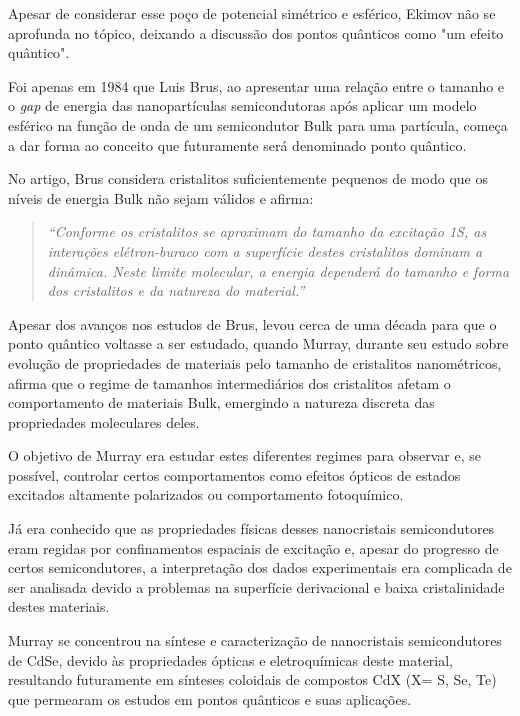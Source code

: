 \documentclass[11pt]{article}
\numberwithin{equation}{section}
\begin{document}
\par Apesar de considerar esse poço de potencial simétrico e esférico, Ekimov não se aprofunda no tópico, deixando a discussão dos pontos quânticos como "um efeito quântico".

\par Foi apenas em 1984 que Luis Brus, ao apresentar uma relação entre o tamanho e o \textit{gap} de energia das nanopartículas semicondutoras após aplicar um modelo esférico na função de onda de um semicondutor Bulk para uma partícula, começa a dar forma ao conceito que futuramente será denominado ponto quântico.

\par No artigo\cite{introducao3}, Brus considera cristalitos suficientemente pequenos de modo que os níveis de energia Bulk não sejam válidos e afirma:

\begin{quote}
\textit{“Conforme os cristalitos se aproximam do tamanho da excitação 1S, as interações elétron-buraco com a superfície destes cristalitos dominam a dinâmica. Neste limite molecular, a energia dependerá do tamanho e forma dos cristalitos e da natureza do material.”}
\end{quote}

\par Apesar dos avanços nos estudos de Brus, levou cerca de uma década para que o ponto quântico voltasse a ser estudado, quando Murray\cite{introducao4}, durante seu estudo sobre evolução de propriedades de materiais pelo tamanho de cristalitos nanométricos, afirma que o regime de tamanhos intermediários dos cristalitos afetam o comportamento de materiais Bulk, emergindo a natureza discreta das propriedades moleculares deles.

\par O objetivo de Murray era estudar estes diferentes regimes para observar e, se possível, controlar certos comportamentos como efeitos ópticos de estados excitados altamente polarizados ou comportamento fotoquímico.

\par Já era conhecido que as propriedades físicas desses nanocristais semicondutores eram regidas por confinamentos espaciais de excitação e, apesar do progresso de certos semicondutores, a interpretação dos dados experimentais era complicada de ser analisada devido a problemas na superfície derivacional e baixa cristalinidade destes materiais.
     
\par Murray se concentrou na síntese e caracterização de nanocristais semicondutores de CdSe, devido às propriedades ópticas e eletroquímicas deste material, resultando futuramente em sínteses coloidais de compostos CdX (X= S, Se, Te) que permearam os estudos em pontos quânticos e suas aplicações.
\end{document}
